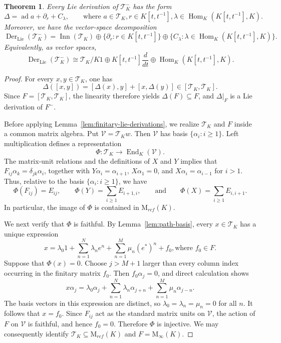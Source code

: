 \documentclass[11pt]{article}
\numberwithin{equation}{section}
\theoremstyle{plain}
\newtheorem{theorem}{Theorem}[section]
\theoremstyle{definition}
\numberwithin{equation}{section}
\newcommand{\T}{\mathscr T_K}
\begin{document}
\begin{theorem}\label{thm:lie-derivations-toeplitz}
Every Lie derivation of $\T^-$ has the form
$$
\Delta=\operatorname{ad}a+\partial_r+C_\lambda,
\qquad \text{where }a\in\T, r\in K[t,t^{-1}],
\lambda\in\operatorname{Hom}_K(K[t,t^{-1}],K).
$$
Moreover, we have the vector-space decomposition
$$
\operatorname{Der}_{\mathrm{Lie}}(\T^-)
=
\operatorname{Inn}(\T)
\oplus\{\partial_r:r\in K[t,t^{-1}]\}
\oplus\{C_\lambda:\lambda\in\operatorname{Hom}_K(K[t,t^{-1}],K)\}.
$$
Equivalently, as vector spaces,
$$
\operatorname{Der}_{\mathrm{Lie}}(\T^-)
\cong
\T/K1\oplus K[t,t^{-1}]\frac{d}{dt}
\oplus \operatorname{Hom}_K(K[t,t^{-1}],K).
$$
\end{theorem}

\begin{proof}
For every $x,y\in\T$, one has
$$
\Delta([x,y])=[\Delta(x),y]+[x,\Delta(y)]\in[\T,\T].
$$
Since $F=[\T,\T]$, the linearity therefore yields $\Delta(F)\subseteq F$, and $\Delta|_F$ is a Lie derivation of $F^-$.

Before applying Lemma~\ref{lem:finitary-lie-derivations}, we realize $\T$ and $F$ inside a common matrix algebra. Put $\mathscr V=\T w$. Then $\mathscr V$ has basis $\{\alpha_i:i\geq1\}$. Left multiplication defines a representation
$$
\Phi:\T\longrightarrow\operatorname{End}_K(\mathscr V).
$$
The matrix-unit relations and the definitions of $X$ and $Y$ implies that $F_{ij}\alpha_k=\delta_{jk}\alpha_i$, together with $Y\alpha_i=\alpha_{i+1}$, $X\alpha_1=0$, and $X\alpha_i=\alpha_{i-1}$ for $i>1$.
Thus, relative to the basis $\{\alpha_i:i\geq1\}$, we have
$$
\Phi(F_{ij})=E_{ij},
\qquad
\Phi(Y)=\sum_{i\geq1}E_{i+1,i},
\qquad\text{and}\qquad
\Phi(X)=\sum_{i\geq1}E_{i,i+1}.
$$
In particular, the image of $\Phi$ is contained in $\mathrm M_{rcf}(K)$.

We next verify that $\Phi$ is faithful. By Lemma~\ref{lem:path-basis}, every $x\in\T$ has a unique expression
$$
x=\lambda_0 1+\sum_{n=1}^{N}\lambda_ne^n
+\sum_{n=1}^{M}\mu_n(e^*)^n+f_0,
\text{where }f_0\in F.
$$
Suppose that $\Phi(x)=0$. Choose $j>M+1$ larger than every column index occurring in the finitary matrix $f_0$. Then $f_0\alpha_j=0$, and direct calculation shows
$$
x\alpha_j
=\lambda_0\alpha_j
+\sum_{n=1}^{N}\lambda_n\alpha_{j+n}
+\sum_{n=1}^{M}\mu_n\alpha_{j-n}.
$$
The basis vectors in this expression are distinct, so $\lambda_0=\lambda_n=\mu_n=0$ for all $n$. It follows that $x=f_0$. Since $F_{ij}$ act as the standard matrix units on $\mathscr V$, the action of $F$ on $\mathscr V$ is faithful, and hence $f_0=0$. Therefore $\Phi$ is injective. We may consequently identify $\T\subseteq\mathrm M_{rcf}(K)$ and $F=\mathrm M_\infty(K)$.


\end{proof}
\end{document}
